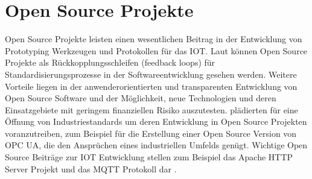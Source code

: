 \documentclass[BMR,Bachelor,ngerman]{twbook}%
\begin{document}
\section{Open Source Projekte}
Open Source Projekte leisten einen wesentlichen Beitrag in der Entwicklung von Prototyping Werkzeugen und Protokollen für das \ac{IOT}. Laut  können Open Source Projekte als Rückkopplungsschleifen (feedback loops) für Standardisierungsprozesse in der Softwareentwicklung gesehen werden. Weitere Vorteile liegen in der anwenderorientierten und transparenten Entwicklung von Open Source Software und der Möglichkeit, neue Technologien und deren Einsatzgebiete mit geringem finanziellen Risiko auszutesten.  plädierten für eine Öffnung von Industriestandards um deren Entwicklung in Open Source Projekten voranzutreiben, zum Beispiel für die Erstellung einer Open Source Version von \ac{OPC UA}, die den Ansprüchen eines industriellen Umfelds genügt. %
Wichtige Open Source Beiträge zur \ac{IOT} Entwicklung stellen zum Beispiel das Apache HTTP Server Projekt \cite{apache} und das \ac{MQTT} Protokoll dar \cite{mqtt}.
%
%
\end{document}
